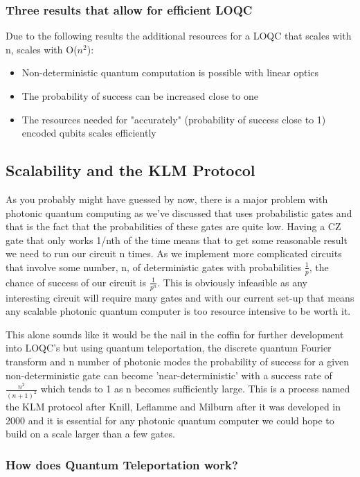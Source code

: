 \subsubsection{Three results that allow for efficient LOQC}
Due to the following results the additional resources for a LOQC that scales with n, scales with O($n^2$):
\begin{itemize}
    \item Non-deterministic quantum computation is possible with linear optics
    \item The probability of success can be increased close to one
    \item The resources needed for "accurately" (probability of success close to 1) encoded qubits scales efficiently  
\end{itemize}

\subsection{Scalability and the KLM Protocol}
As you probably might have guessed by now, there is a major problem with photonic quantum computing as we've discussed that uses probabilistic gates and that is the fact that the probabilities of these gates are quite low. Having a CZ gate that only works 1/nth of the time means that to get some reasonable result we need to run our circuit n times. As we implement more complicated circuits that involve some number, n, of deterministic gates with probabilities $\frac{1}{p}$, the chance of success of our circuit is $\frac{1}{p^n}$. This is obviously infeasible as any interesting circuit will require many gates and with our current set-up that means any scalable photonic quantum computer is too resource intensive to be worth it. \par
This alone sounds like it would be the nail in the coffin for further development into LOQC's but using quantum teleportation, the discrete quantum Fourier transform and n number of photonic modes the probability of success for a given non-deterministic gate can become 'near-deterministic' with a success rate of $\frac{n^2}{(n+1)^2}$ which tends to 1 as n becomes sufficiently large. This is a process named the KLM protocol after Knill, Leflamme and Milburn after it was developed in 2000 and it is essential for any photonic quantum computer we could hope to build on a scale larger than a few gates.

\subsubsection{How does Quantum Teleportation work?}

